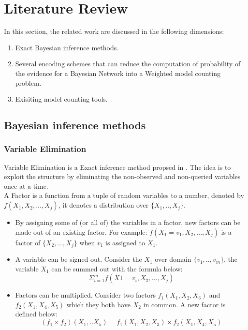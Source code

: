 \newpage
\section{Literature Review}
In this section, the related work are discussed in the following dimensions:
\begin{enumerate}
    \item Exact Bayesian inference methods.
    \item Several encoding schemes that can reduce the computation of probability of the evidence for a Bayesian Network into a Weighted model counting problem. 
    \item Exisiting model counting tools.
\end{enumerate}
    \subsection{Bayesian inference methods}
        \subsubsection{Variable Elimination}
        Variable Elimination is a Exact inference method propsed in \cite{Varelimination}. The idea is to exploit the structure by eliminating the non-observed and non-queried variables once at a time.\\
        
       \noindent A Factor is a function from a tuple of random variables to a number, denoted by $f(X_{1}, X_{2}, ... , X_{j})$, it denotes a distribution over $\{X_{1}, .., X_{j}\}$. 
        \begin{itemize}
            \item  By assigning some of (or all of) the variables in a factor, new factors can be made out of an existing factor. For example: $f(X_{1} = v_{1}, X_{2}, ..., X_{j})$ is a factor of $\{X_{2}, ... , X_{j}\}$ when $v_{1}$ is assigned to $X_{1}$.
            \item A variable can be signed out. Consider the $X_{1}$ over domain $\{v_{1}, .. ,v_{m}\}$, the variable $X_{1}$ can be summed out with the formula below: $$\Sigma_{i= 1}^{m}f(X1 = v_{i}, X_{2}, ..., X_{j})$$
            \item Factors can be multiplied. Consider two factors $f_{1}(X_{1}, X_{2}, X_{3})$ and $f_{2}(X_{1}, X_{4}, X_{5})$ which they both have $X_{2}$ in common. A new factor is defined below: $$(f_{1} \times f_{2})(X_{1}, .. X_{5}) = f_{1}(X_{1}, X_{2}, X_{3}) \times f_{2}(X_{1}, X_{4}, X_{5}) $$
        \end{itemize}
        
